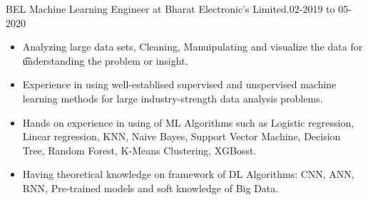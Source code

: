 %
%
%

\renewcommand{\baselinestretch}{1.0}
\begin{experiences}
  \experience
    {BEL}   {Machine Learning Engineer at Bharat Electronic's Limited.02-2019 to 05-2020 }{}{}
    {} {
                      \begin{itemize}
                        \item Analyzing large data sets, Cleaning, Manuipulating and visualize the data for \t  understanding the problem or insight.                       
                        \item Experience in using well-establised supervised and unspervised machine learning methods for large industry-strength data analysis problems.
                        
                        \item Hands on experience in using of ML Algorithms such as Logistic regression, Linear regression, KNN, Naive Bayes, Support Vector Machine, Decision Tree, Random Forest, K-Means Clustering, XGBosst. 
                        
                        \item Having theoretical knowledge on framework of DL Algorithms: CNN, ANN, RNN, Pre-trained models and soft knowledge of Big Data.
                        
                        
                      \end{itemize}
                    }


\end{experiences}
